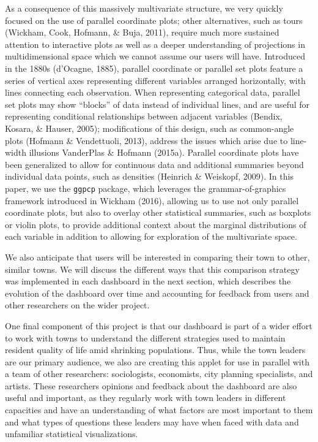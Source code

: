 \documentclass[print]{nuthesis}
\begin{document}
As a consequence of this massively multivariate structure, we very quickly focused on the use of parallel coordinate plots; other alternatives, such as tours (Wickham, Cook, Hofmann, \& Buja, 2011), require much more sustained attention to interactive plots as well as a deeper understanding of projections in multidimensional space which we cannot assume our users will have. Introduced in the 1880s (d'Ocagne, 1885), parallel coordinate or parallel set plots feature a series of vertical axes representing different variables arranged horizontally, with lines connecting each observation. When representing categorical data, parallel set plots may show ``blocks'' of data instead of individual lines, and are useful for representing conditional relationships between adjacent variables (Bendix, Kosara, \& Hauser, 2005); modifications of this design, such as common-angle plots (Hofmann \& Vendettuoli, 2013), address the issues which arise due to line-width illusions VanderPlas \& Hofmann (2015a). Parallel coordinate plots have been generalized to allow for continuous data and additional summaries beyond individual data points, such as densities (Heinrich \& Weiskopf, 2009). In this paper, we use the \texttt{ggpcp} package, which leverages the grammar-of-graphics framework introduced in Wickham (2016), allowing us to use not only parallel coordinate plots, but also to overlay other statistical summaries, such as boxplots or violin plots, to provide additional context about the marginal distributions of each variable in addition to allowing for exploration of the multivariate space.

We also anticipate that users will be interested in comparing their town to other, similar towns. We will discuss the different ways that this comparison strategy was implemented in each dashboard in the next section, which describes the evolution of the dashboard over time and accounting for feedback from users and other researchers on the wider project.

One final component of this project is that our dashboard is part of a wider effort to work with towns to understand the different strategies used to maintain resident quality of life amid shrinking populations. Thus, while the town leaders are our primary audience, we also are creating this applet for use in parallel with a team of other researchers: sociologists, economists, city planning specialists, and artists. These researchers opinions and feedback about the dashboard are also useful and important, as they regularly work with town leaders in different capacities and have an understanding of what factors are most important to them and what types of questions these leaders may have when faced with data and unfamiliar statistical visualizations.
\end{document}
